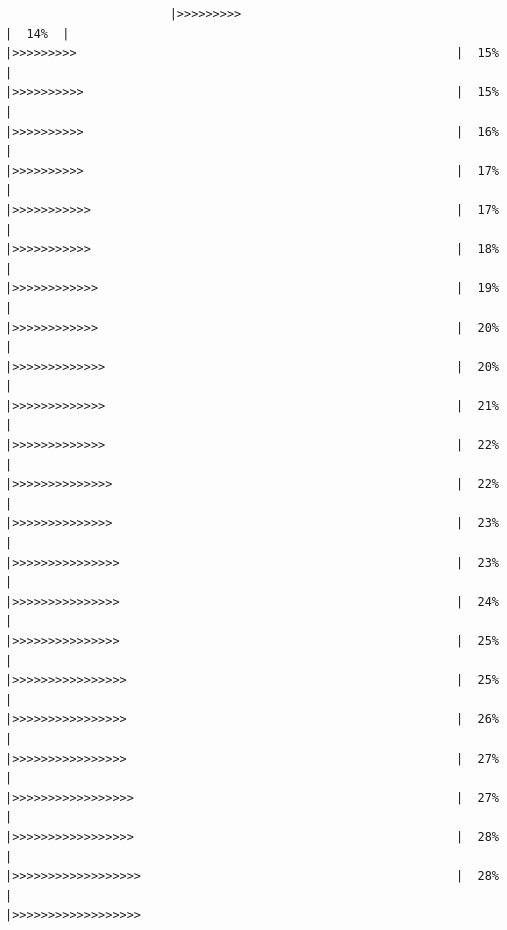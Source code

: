 \documentclass[
]{book}
\begin{document}
\begin{verbatim}
                       |>>>>>>>>>                                                     |  14%  |                                                                      |>>>>>>>>>                                                     |  15%  |                                                                      |>>>>>>>>>>                                                    |  15%  |                                                                      |>>>>>>>>>>                                                    |  16%  |                                                                      |>>>>>>>>>>                                                    |  17%  |                                                                      |>>>>>>>>>>>                                                   |  17%  |                                                                      |>>>>>>>>>>>                                                   |  18%  |                                                                      |>>>>>>>>>>>>                                                  |  19%  |                                                                      |>>>>>>>>>>>>                                                  |  20%  |                                                                      |>>>>>>>>>>>>>                                                 |  20%  |                                                                      |>>>>>>>>>>>>>                                                 |  21%  |                                                                      |>>>>>>>>>>>>>                                                 |  22%  |                                                                      |>>>>>>>>>>>>>>                                                |  22%  |                                                                      |>>>>>>>>>>>>>>                                                |  23%  |                                                                      |>>>>>>>>>>>>>>>                                               |  23%  |                                                                      |>>>>>>>>>>>>>>>                                               |  24%  |                                                                      |>>>>>>>>>>>>>>>                                               |  25%  |                                                                      |>>>>>>>>>>>>>>>>                                              |  25%  |                                                                      |>>>>>>>>>>>>>>>>                                              |  26%  |                                                                      |>>>>>>>>>>>>>>>>                                              |  27%  |                                                                      |>>>>>>>>>>>>>>>>>                                             |  27%  |                                                                      |>>>>>>>>>>>>>>>>>                                             |  28%  |                                                                      |>>>>>>>>>>>>>>>>>>                                            |  28%  |                                                                      |>>>>>>>>>>>>>>>>>>           
\end{verbatim}
\end{document}
